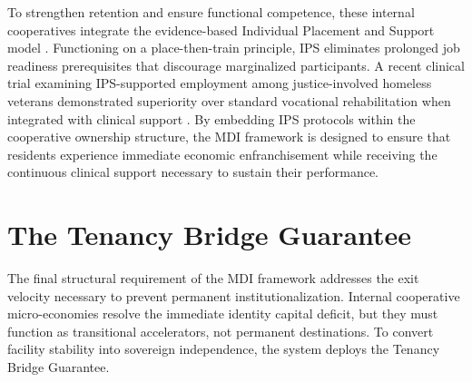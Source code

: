 \documentclass[12pt, letterpaper]{article}
\begin{document}
To strengthen retention and ensure functional competence, these internal cooperatives integrate the evidence-based Individual Placement and Support model \citep{drake2012individual}. Functioning on a place-then-train principle, IPS eliminates prolonged job readiness prerequisites that discourage marginalized participants. A recent clinical trial examining IPS-supported employment among justice-involved homeless veterans demonstrated superiority over standard vocational rehabilitation when integrated with clinical support \citep{lepage2021individualized}. By embedding IPS protocols within the cooperative ownership structure, the MDI framework is designed to ensure that residents experience immediate economic enfranchisement while receiving the continuous clinical support necessary to sustain their performance.

\section{The Tenancy Bridge Guarantee}\label{sec:tbg}

The final structural requirement of the MDI framework addresses the exit velocity necessary to prevent permanent institutionalization. Internal cooperative micro-economies resolve the immediate identity capital deficit, but they must function as transitional accelerators, not permanent destinations. To convert facility stability into sovereign independence, the system deploys the Tenancy Bridge Guarantee.
\end{document}
